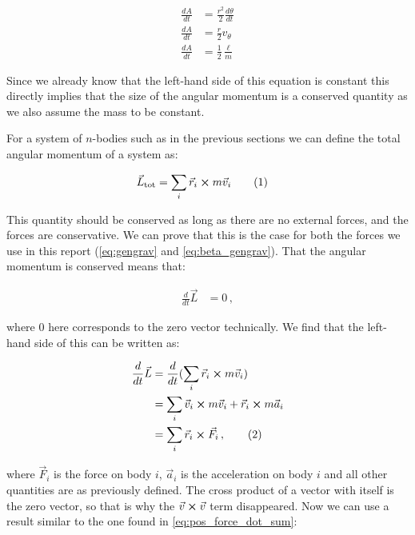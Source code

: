 \documentclass[reprint,english,notitlepage]{revtex4-1}  %
\newcommand\numberthis{\addtocounter{equation}{1}\tag{\theequation}}
\begin{document}
\begin{align*}
\frac{dA}{dt} &= \frac{r^2}{2} \frac{d\theta}{dt} \\
\frac{dA}{dt} &= \frac{r}{2} v_\theta \\
\frac{dA}{dt} &= \frac{1}{2} \frac{\ell}{m} 
\end{align*}

Since we already know that the left-hand side of this equation is constant this directly implies that the size of the angular momentum is a conserved quantity as we also assume the mass to be constant. 

For a system of $n$-bodies such as in the previous sections we can define the total angular momentum of a system as:

\begin{align*}
\vec{L}_\text{tot} &= \sum\limits_i \vec{r}_i \cross m\vec{v}_i \numberthis \label{eq:tot_ang_mom}
\end{align*}

This quantity should be conserved as long as there are no external forces, and the forces are conservative. We can prove that this is the case for both the forces we use in this report (\eqref{eq:gengrav} and \eqref{eq:beta_gengrav}). That the angular momentum is conserved means that:

\begin{align*}
\frac{d}{dt} \vec{L} &= 0 \, , 
\end{align*}

where 0 here corresponds to the zero vector technically. We find that the left-hand side of this can be written as:

\begin{align*}
\frac{d}{dt} \vec{L} &= \frac{d}{dt} (\sum\limits_i \vec{r}_i \cross m \vec{v}_i)  \\
&= \sum\limits_i \vec{v}_i \cross m \vec{v}_i + \vec{r}_i \cross m \vec{a}_i \\
&= \sum\limits_i \vec{r}_i \cross \vec{F}_i  \, , \numberthis \label{eq:interm_ang_mom_cons}
\end{align*}

where $\vec{F}_i$ is the force on body $i$, $\vec{a}_i$ is the acceleration on body $i$ and all other quantities are as previously defined. The cross product of a vector with itself is the zero vector, so that is why the $\vec{v} \cross \vec{v}$ term disappeared. Now we can use a result similar to the one found in \eqref{eq:pos_force_dot_sum}:
\end{document}
